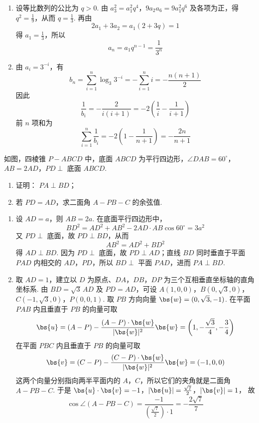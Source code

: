 \begin{solution}
\begin{enumerate}
\item 设等比数列的公比为 \(q>0\). 由 \(a_{3}^{2}=a_{1}^{2}q^{4}\)，\(9a_{2}a_{6}=9a_{1}^{2}q^{6}\)
及各项为正，得 \(q^{2}=\frac{1}{9}\)，从而 \(q=\frac{1}{3}\). 再由
\[
2a_{1}+3a_{2}=a_{1}(2+3q)=1
\]
得 \(a_{1}=\frac{1}{3}\)，所以
\[
a_{n}=a_{1}q^{n-1}=\frac{1}{3^{n}}
\]
\item 由 \(a_{i}=3^{-i}\)，有
\[
b_{n}=\sum_{i=1}^{n}\log_{3}3^{-i}
=-\sum_{i=1}^{n}i=-\frac{n(n+1)}2
\]
因此
\[
\frac1{b_{i}}=-\frac{2}{i(i+1)}
=-2\left(\frac1i-\frac1{i+1}\right)
\]
前 \(n\) 项和为
\[
\sum_{i=1}^{n}\frac1{b_{i}}
=-2\left(1-\frac1{n+1}\right)
=-\frac{2n}{n+1}
\]
\end{enumerate}
\end{solution}

\begin{problem}
如图，四棱锥 \(P - ABCD\) 中，底面 \(ABCD\) 为平行四边形，\(\angle DAB = 60^{\circ}\)，\(AB = 2AD\)，\(PD \perp\) 底面 \(ABCD\).
\begin{enumerate}
\item 证明： \(PA \perp BD\)；
\item 若 \(PD = AD\)，求二面角 \(A - PB - C\) 的余弦值.
\end{enumerate}

\end{problem}

\begin{solution}
\begin{enumerate}
\item 设 \(AD=a\)，则 \(AB=2a\). 在底面平行四边形中，
\[
BD^{2}=AD^{2}+AB^{2}-2AD\cdot AB\cos60^\circ=3a^{2}
\]
又 \(PD\perp\) 底面，故 \(PD\perp BD\)，从而
\[
AB^{2}=AD^{2}+BD^{2}
\]
得 \(AD\perp BD\). 因为 \(PD\perp\) 底面，故 \(PD\perp AD\)；直线 \(BD\) 同时垂直于平面 \(PAD\) 内相交的 \(AD\)，\(PD\)，所以 \(BD\perp\) 平面 \(PAD\)，进而 \(PA\perp BD\).
\item 取 \(AD=1\)，建立以 \(D\) 为原点、\(DA\)，\(DB\)，\(DP\) 为三个互相垂直坐标轴的直角坐标系. 由 \(BD=\sqrt3\,AD\) 及 \(PD=AD\)，可设 \(A(1,0,0)\)，\(B(0,\sqrt3,0)\)，\(C(-1,\sqrt3,0)\)，\(P(0,0,1)\).
取 \(PB\) 方向向量 \(\bs{w}=(0,\sqrt3,-1)\). 在平面 \(PAB\) 内且垂直于 \(PB\) 的向量可取
\[
\bs{u}=(A-P)-\frac{(A-P)\cdot\bs{w}}{|\bs{w}|^{2}}\bs{w}
=\left(1,-\frac{\sqrt3}{4},-\frac34\right)
\]
在平面 \(PBC\) 内且垂直于 \(PB\) 的向量可取
\[
\bs{v}=(C-P)-\frac{(C-P)\cdot\bs{w}}{|\bs{w}|^{2}}\bs{w}
=(-1,0,0)
\]
这两个向量分别指向两半平面内的 \(A\)，\(C\)，所以它们的夹角就是二面角 \(A-PB-C\). 于是 \(\bs{u}\cdot\bs{v}=-1\)，\(|\bs{u}|=\frac{\sqrt7}{2}\)，\(|\bs{v}|=1\)，
故
\[
\cos\angle(A-PB-C)
=\frac{-1}{(\frac{\sqrt7}{2})\cdot1}
=-\frac{2\sqrt7}{7}
\]
\end{enumerate}
\end{solution}

